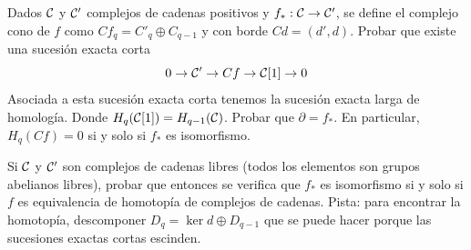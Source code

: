 \documentclass[TA.tex]{subfiles}
\begin{document}
\begin{ejer}
Dados $\mathcal{C}$ y $\mathcal{C}'$ complejos de cadenas positivos y $f_*:\mathcal{C}\to\mathcal{C}'$, se define el complejo cono de $f$ como $Cf_q=C'_q\oplus C_{q-1}$ y con borde $Cd=(d',d)$. Probar que existe una sucesión exacta corta
\[
0\to \mathcal{C}'\to Cf\to \mathcal{C}[1]\to 0
\]
Asociada a esta sucesión exacta corta tenemos la sucesión exacta larga de homología. Donde $H_q(\mathcal{C}[1])=H_{q-1}(\mathcal{C})$. Probar que $\partial=f_*$. En particular, $H_q(Cf)=0$ si y solo si $f_*$ es isomorfismo. 

Si $\mathcal{C}$ y $\mathcal{C}'$ son complejos de cadenas libres (todos los elementos son grupos abelianos libres), probar que entonces se verifica que $f_*$ es isomorfismo si y solo si $f$ es equivalencia de homotopía de complejos de cadenas.  Pista: para encontrar la homotopía, descomponer $D_q=\ker d\oplus D_{q-1}$ que se puede hacer porque las sucesiones exactas cortas escinden. 

\end{ejer}
\end{document}
